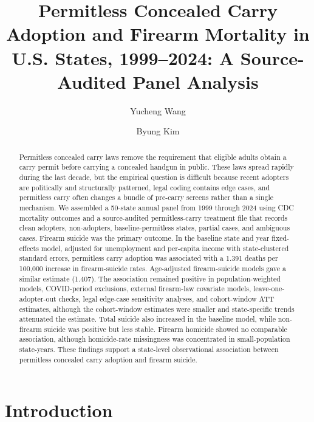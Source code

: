 \documentclass[11pt]{article}
\title{\bfseries Permitless Concealed Carry Adoption and Firearm Mortality in U.S. States, 1999--2024: A Source-Audited Panel Analysis}
\author[1]{Yucheng Wang}
\author[2]{Byung Kim}
\affil[1]{University of Wisconsin--Madison, Madison, WI, USA}
\affil[2]{United States Air Force Academy, Colorado Springs, CO, USA}
\affil[]{\textit{Yucheng Wang and Byung Kim contributed equally to this work.}}
\date{}
\begin{document}
\maketitle

\begin{abstract}
Permitless concealed carry laws remove the requirement that eligible adults obtain a carry permit before carrying a concealed handgun in public. These laws spread rapidly during the last decade, but the empirical question is difficult because recent adopters are politically and structurally patterned, legal coding contains edge cases, and permitless carry often changes a bundle of pre-carry screens rather than a single mechanism. We assembled a 50-state annual panel from 1999 through 2024 using CDC mortality outcomes and a source-audited permitless-carry treatment file that records clean adopters, non-adopters, baseline-permitless states, partial cases, and ambiguous cases. Firearm suicide was the primary outcome. In the baseline state and year fixed-effects model, adjusted for unemployment and per-capita income with state-clustered standard errors, permitless carry adoption was associated with a 1.391 deaths per 100,000 increase in firearm-suicide rates. Age-adjusted firearm-suicide models gave a similar estimate (1.407). The association remained positive in population-weighted models, COVID-period exclusions, external firearm-law covariate models, leave-one-adopter-out checks, legal edge-case sensitivity analyses, and cohort-window ATT estimates, although the cohort-window estimates were smaller and state-specific trends attenuated the estimate. Total suicide also increased in the baseline model, while non-firearm suicide was positive but less stable. Firearm homicide showed no comparable association, although homicide-rate missingness was concentrated in small-population state-years. These findings support a state-level observational association between permitless concealed carry adoption and firearm suicide.
\end{abstract}

\section*{Introduction}
\end{document}
